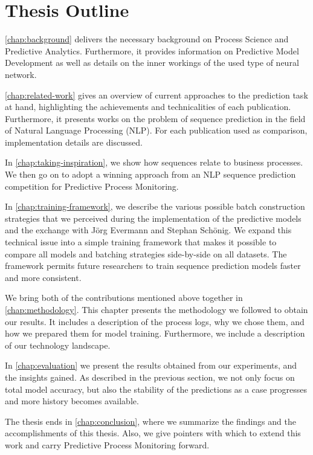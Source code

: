\section{Thesis Outline}\label{sec:intro:outline}
\autoref{chap:background} delivers the necessary background on Process Science and Predictive Analytics. Furthermore, it provides information on Predictive Model Development as well as details on the inner workings of the used type of neural network.

\autoref{chap:related-work} gives an overview of current approaches to the prediction task at hand, highlighting the achievements and technicalities of each publication. Furthermore, it presents works on the problem of sequence prediction in the field of Natural Language Processing (NLP). For each publication used as comparison, implementation details are discussed.

In \autoref{chap:taking-inspiration}, we show how sequences relate to business processes.
We then go on to adopt a winning approach from an NLP sequence prediction competition for Predictive Process Monitoring.

In \autoref{chap:training-framework}, we describe the various possible batch construction strategies that we perceived during the implementation of the predictive models and the exchange with Jörg Evermann and Stephan Schönig. We expand this technical issue into a simple training framework that makes it possible to compare all models and batching strategies side-by-side on all datasets. The framework permits future researchers to train sequence prediction models faster and more consistent.

We bring both of the contributions mentioned above together in \autoref{chap:methodology}.
This chapter presents the methodology we followed to obtain our results.
It includes a description of the process logs, why we chose them, and how we prepared them for model training.
Furthermore, we include a description of our technology landscape.

In \autoref{chap:evaluation} we present the results obtained from our experiments, and the insights gained. As described in the previous section, we not only focus on total model accuracy, but also the stability of the predictions as a case progresses and more history becomes available.

The thesis ends in \autoref{chap:conclusion}, where we summarize the findings and the accomplishments of this thesis. Also, we give pointers with which to extend this work and carry Predictive Process Monitoring forward.

